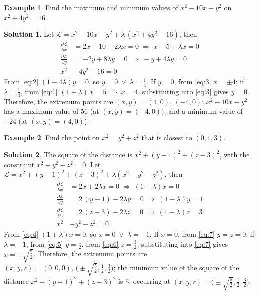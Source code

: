 \documentclass[10pt]{extarticle}
\newcommand{\ds}{\displaystyle}
\newcommand{\ie}{\;\Longrightarrow\;}
\newcommand{\orr}{\;\vee\;}
\theoremstyle{definition}
\newtheorem*{ex}{Example}
\newtheorem*{sol}{Solution}
\newcommand{\pdiff}[2]{\frac{\partial #1}{\partial #2}}
\begin{document}
\newpage

\begin{ex} 
  Find the maximum and minimum values of $\ds x^2 - 10 x - y^2$ on $\ds x^2 + 4 y^2 = 16$. 
\end{ex}

\begin{sol}
  Let $\ds\mathcal{L} = x^2 - 10 x - y^2 + \lambda\,(x^2 + 4 y^2 - 16)$, then 
  \begin{align}
    \pdiff{\mathcal{L}}{x} &= 2 x - 10 + 2\lambda x = 0\ie x - 5 + \lambda x = 0 \label{eq:1}\\
    \pdiff{\mathcal{L}}{y} &= -2y + 8\lambda y = 0\ie -y + 4\lambda y = 0 \label{eq:2} \\
    x^2 &+ 4 y^2 - 16 = 0 \label{eq:3}
  \end{align}
  From \eqref{eq:2} $(1 - 4\lambda) y = 0$, so $y = 0\orr\lambda = \frac{1}{4}$. If $y = 0$, from \eqref{eq:3} $x = \pm 4$; if $\lambda=\frac{1}{4}$, from \eqref{eq:1} $(1 + \lambda)\,x = 5\ie x = 4$, substituting into \eqref{eq:3} gives $y = 0$. Therefore, the extremum points are $(x, y) = (4, 0),\,(-4, 0)$; $x^2 - 10x - y^2$ has a maximum value of $56$ (at $(x, y) = (-4, 0)$), and a minimum value of $-24$ (at $(x, y) = (4, 0)$). 
\end{sol}

\newpage

\begin{ex}
  Find the point on $x^2 = y^2 + z^2$ that is closest to $(0, 1, 3)$. 
\end{ex}

\begin{sol}
  The square of the distance is $x^2 + (y - 1)^2 + (z - 3)^2$, with the constraint $x^2 - y^2 - z^2 = 0$. Let $\ds\mathcal{L} = x^2 + (y - 1)^2 + (z - 3)^2 + \lambda(x^2 - y^2 - z^2)$, then
  \begin{align}
    \pdiff{\mathcal{L}}{x} &= 2 x + 2\lambda x = 0\ie (1 + \lambda) x = 0 \label{eq:4}\\
    \pdiff{\mathcal{L}}{y} &= 2\,(y - 1) - 2\lambda y = 0\ie (1 - \lambda) y = 1 \label{eq:5} \\
    \pdiff{\mathcal{L}}{z} &= 2\,(z - 3) - 2\lambda z = 0\ie (1 - \lambda) z = 3 \label{eq:6} \\
    x^2 &- y^2 - z^2 = 0 \label{eq:7}
  \end{align}
  From \eqref{eq:4} $(1 + \lambda) x = 0$, so $x = 0\orr\lambda = -1$. If $x = 0$, from \eqref{eq:7} $y = z = 0$; if $\lambda = -1$, from \eqref{eq:5} $y = \frac{1}{2}$, from \eqref{eq:6} $z = \frac{3}{2}$, substituting into \eqref{eq:7} gives $x = \pm\sqrt{\frac{5}{2}}$. Therefore, the extremum points are $(x, y, z) = (0, 0, 0),\,\Big(\pm\sqrt{\frac{5}{2}}, \frac{1}{2}, \frac{3}{2}\Big)$; the minimum value of the square of the distance $x^2 + (y - 1)^2 + (z - 3)^2$ is $5$, occurring at $(x, y, z) = \Big(\pm\sqrt{\frac{5}{2}}, \frac{1}{2}, \frac{3}{2}\Big)$. 
\end{sol}
\end{document}
